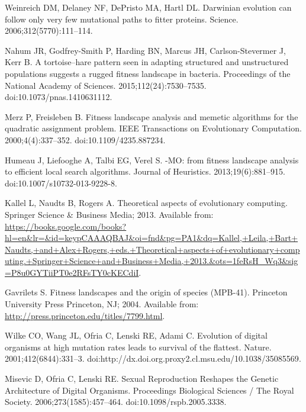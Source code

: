 \documentclass[10pt,letterpaper,final]{article}
\begin{document}
\begin{thebibliography}{10}
Weinreich DM, Delaney NF, DePristo MA, Hartl DL.
\newblock Darwinian evolution can follow only very few mutational paths to
  fitter proteins.
\newblock Science. 2006;312(5770):111--114.

Nahum JR, Godfrey-Smith P, Harding BN, Marcus JH, Carlson-Stevermer J, Kerr B.
\newblock A tortoise–hare pattern seen in adapting structured and
  unstructured populations suggests a rugged fitness landscape in bacteria.
\newblock Proceedings of the National Academy of Sciences.
  2015;112(24):7530--7535.
\newblock doi:{10.1073/pnas.1410631112}.

Merz P, Freisleben B.
\newblock Fitness landscape analysis and memetic algorithms for the quadratic
  assignment problem.
\newblock IEEE Transactions on Evolutionary Computation. 2000;4(4):337--352.
\newblock doi:{10.1109/4235.887234}.

Humeau J, Liefooghe A, Talbi EG, Verel S.
-{MO}: from fitness landscape analysis to efficient local
  search algorithms.
\newblock Journal of Heuristics. 2013;19(6):881--915.
\newblock doi:{10.1007/s10732-013-9228-8}.

Kallel L, Naudts B, Rogers A.
\newblock Theoretical aspects of evolutionary computing.
\newblock Springer Science \& Business Media; 2013.
\newblock Available from:
  \url{https://books.google.com/books?hl=en&lr=&id=keypCAAAQBAJ&oi=fnd&pg=PA1&dq=Kallel,+Leila,+Bart+Naudts,+and+Alex+Rogers,+eds.+Theoretical+aspects+of+evolutionary+computing.+Springer+Science+and+Business+Media,+2013.&ots=1feRsH_Wq3&sig=P8u0GYTiiPT0e2RFsTY0cKECdiI}.

Gavrilets S.
\newblock Fitness landscapes and the origin of species ({MPB}-41).
\newblock Princeton University Press Princeton, NJ; 2004.
\newblock Available from: \url{http://press.princeton.edu/titles/7799.html}.

Wilke CO, Wang JL, Ofria C, Lenski RE, Adami C.
\newblock Evolution of digital organisms at high mutation rates leads to
  survival of the flattest.
\newblock Nature. 2001;412(6844):331--3.
\newblock doi:{http://dx.doi.org.proxy2.cl.msu.edu/10.1038/35085569}.

Misevic D, Ofria C, Lenski RE.
\newblock Sexual {Reproduction} {Reshapes} the {Genetic} {Architecture} of
  {Digital} {Organisms}.
\newblock Proceedings Biological Sciences / The Royal Society.
  2006;273(1585):457--464.
\newblock doi:{10.1098/rspb.2005.3338}.


\end{thebibliography}
\end{document}
